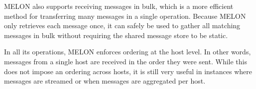 MELON also supports receiving messages in bulk, which is a more efficient method for transferring many messages in a single operation. Because MELON only retrieves each message once, it can safely be used to gather all matching messages in bulk without requiring the shared message store to be static.

In all its operations, MELON enforces ordering at the host level. In other words, messages from a single host are received in the order they were sent. While this does not impose an ordering across hosts, it is still very useful in instances where messages are streamed or when messages are aggregated per host.